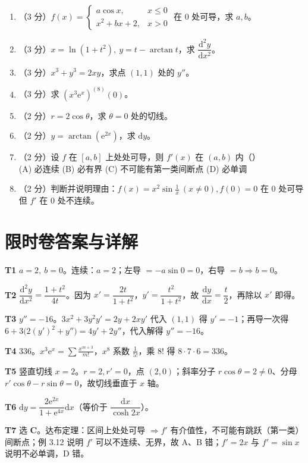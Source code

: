 \documentclass[11pt,a4paper]{ctexart}
\newcommand{\ee}{\mathrm{e}}
\newcommand{\D}{\mathrm{d}}
\begin{document}
\begin{enumerate}[label=\textbf{T\arabic*.},leftmargin=2.4em,itemsep=8pt]
\item（3 分）$f(x)=\begin{cases}a\cos x,&x\le0\\ x^2+bx+2,&x>0\end{cases}$ 在 $0$ 处可导，求 $a,b$。
\item（3 分）$x=\ln(1+t^2),\ y=t-\arctan t$，求 $\dfrac{\D^2y}{\D x^2}$。
\item（3 分）$x^3+y^3=2xy$，求点 $(1,1)$ 处的 $y''$。
\item（3 分）求 $(x^3\ee^{x})^{(8)}(0)$。
\item（2 分）$r=2\cos\theta$，求 $\theta=0$ 处的切线。
\item（2 分）$y=\arctan(\ee^{2x})$，求 $\D y$。
\item（2 分）设 $f$ 在 $[a,b]$ 上处处可导，则 $f'(x)$ 在 $(a,b)$ 内（\quad）\\
(A) 必连续 \quad (B) 必有界 \quad (C) 不可能有第一类间断点 \quad (D) 必单调
\item（2 分）判断并说明理由：$f(x)=x^2\sin\frac1x\ (x\ne0),f(0)=0$ 在 $0$ 处可导但 $f'$ 在 $0$ 处不连续。
\end{enumerate}

\section{限时卷答案与详解}

\textbf{T1} $a=2,\ b=0$。连续：$a=2$；左导 $=-a\sin0=0$，右导 $=b\Rightarrow b=0$。

\textbf{T2} $\dfrac{\D^2y}{\D x^2}=\dfrac{1+t^2}{4t}$。因为 $x'=\dfrac{2t}{1+t^2}$，$y'=\dfrac{t^2}{1+t^2}$，故 $\dfrac{\D y}{\D x}=\dfrac t2$，再除以 $x'$ 即得。

\textbf{T3} $y''=-16$。$3x^2+3y^2y'=2y+2xy'$ 代入 $(1,1)$ 得 $y'=-1$；再导一次得 $6+3\bigl(2(y')^2+y''\bigr)=4y'+2y''$，代入解得 $y''=-16$。

\textbf{T4} $336$。$x^3\ee^x=\sum\frac{x^{m+3}}{m!}$，$x^8$ 系数 $\frac1{5!}$，乘 $8!$ 得 $8\cdot7\cdot6=336$。

\textbf{T5} 竖直切线 $x=2$。$r=2,r'=0$，点 $(2,0)$；斜率分子 $r\cos\theta=2\ne0$、分母 $r'\cos\theta-r\sin\theta=0$，故切线垂直于 $x$ 轴。

\textbf{T6} $\D y=\dfrac{2\ee^{2x}}{1+\ee^{4x}}\D x$（等价于 $\dfrac{\D x}{\cosh 2x}$）。

\textbf{T7} 选 \textbf{C}。达布定理：区间上处处可导 $\Rightarrow f'$ 有介值性，不可能有跳跃（第一类）间断点；例 3.12 说明 $f'$ 可以不连续、无界，故 A、B 错；$f'=2x$ 与 $f'=\sin x$ 说明不必单调，D 错。
\end{document}
